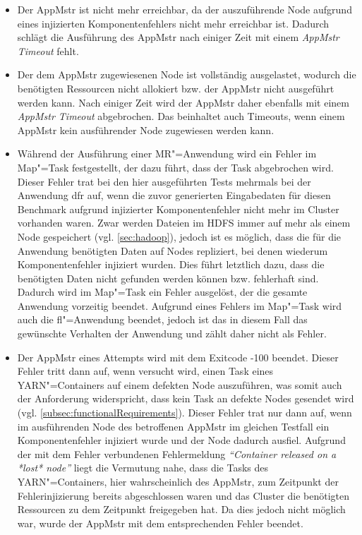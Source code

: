 \begin{itemize}[itemsep=5pt]
    \item
        Der \gls{AppMstr} ist nicht mehr erreichbar, da der auszuführende Node aufgrund eines injizierten Komponentenfehlers nicht mehr erreichbar ist.
        Dadurch schlägt die Ausführung des \gls{AppMstr} nach einiger Zeit mit einem \emph{\gls{AppMstr} Timeout} fehlt.
        
    \item
        Der dem \gls{AppMstr} zugewiesenen Node ist vollständig ausgelastet, wodurch die benötigten Ressourcen nicht allokiert bzw. der \gls{AppMstr} nicht ausgeführt werden kann.
        Nach einiger Zeit wird der \gls{AppMstr} daher ebenfalls mit einem \emph{\gls{AppMstr} Timeout} abgebrochen.
        Das beinhaltet auch Timeouts, wenn einem \gls{AppMstr} kein ausführender Node zugewiesen werden kann.
        
    \item
        Während der Ausführung einer \gls{MR}"=Anwendung wird ein Fehler im Map"=Task festgestellt, der dazu führt, dass der Task abgebrochen wird.
        Dieser Fehler trat bei den hier ausgeführten Tests mehrmals bei der Anwendung \acrlong{dfr} auf, wenn die zuvor generierten Eingabedaten für diesen Benchmark aufgrund injizierter Komponentenfehler nicht mehr im Cluster vorhanden waren.
        Zwar werden Dateien im HDFS immer auf mehr als einem Node gespeichert (vgl. \cref{sec:hadoop}), jedoch ist es möglich, dass die für die Anwendung benötigten Daten auf Nodes repliziert, bei denen wiederum Komponentenfehler injiziert wurden.
        Dies führt letztlich dazu, dass die benötigten Daten nicht gefunden werden können bzw. fehlerhaft sind.
        Dadurch wird im Map"=Task ein Fehler ausgelöst, der die gesamte Anwendung vorzeitig beendet.
        Aufgrund eines Fehlers im Map"=Task wird auch die \acrlong{fl}"=Anwendung beendet, jedoch ist das in diesem Fall das gewünschte Verhalten der Anwendung und zählt daher nicht als Fehler.
        
    \item
        Der \gls{AppMstr} eines Attempts wird mit dem Exitcode -100 beendet.
        Dieser Fehler tritt dann auf, wenn versucht wird, einen Task eines YARN"=Containers auf einem defekten Node auszuführen, was somit auch der Anforderung widerspricht, dass kein Task an defekte Nodes gesendet wird (vgl. \cref{subsec:functionalRequirements}).
        Dieser Fehler trat nur dann auf, wenn im ausführenden Node des betroffenen \gls{AppMstr} im gleichen Testfall ein Komponentenfehler injiziert wurde und der Node dadurch ausfiel.
        Aufgrund der mit dem Fehler verbundenen Fehlermeldung \emph{\enquote{Container released on a *lost* node}} liegt die Vermutung nahe, dass die Tasks des YARN"=Containers, hier wahrscheinlich des \gls{AppMstr}, zum Zeitpunkt der Fehlerinjizierung bereits abgeschlossen waren und das Cluster die benötigten Ressourcen zu dem Zeitpunkt freigegeben hat.
        Da dies jedoch nicht möglich war, wurde der \gls{AppMstr} mit dem entsprechenden Fehler beendet.
\end{itemize}


